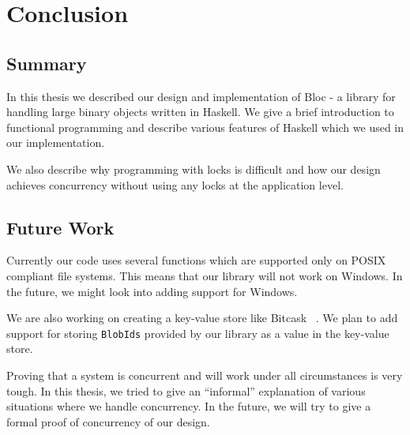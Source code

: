 \chapter{Conclusion}
\label{chap:conclusion}

\section{Summary}
In this thesis we described our design and implementation of Bloc - a library for handling large binary objects written in Haskell. We give a brief introduction to functional programming and describe various features of Haskell which we used in our implementation.

We also describe why programming with locks is difficult and how our design achieves concurrency without using any locks at the application level.

\section{Future Work}
Currently our code uses several functions which are supported only on POSIX compliant file systems. This means that our library will not work on Windows. In the future, we might look into adding support for Windows.

We are also working on creating a key-value store like Bitcask ~\cite{sheehy2010bitcask}. We plan to add support for storing \texttt{BlobIds} provided by our library as a value in the key-value store.

Proving that a system is concurrent and will work under all circumstances is very tough. In this thesis, we tried to give an ``informal'' explanation of various situations where we handle concurrency. In the future, we will try to give a formal proof of concurrency of our design.
